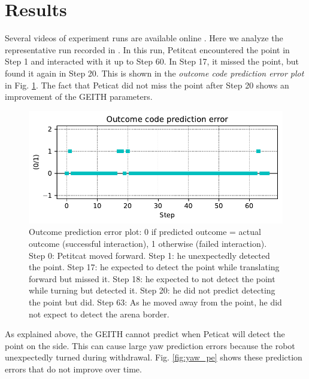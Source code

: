 \documentclass[runningheads]{llncs}
\begin{document}
\section{Results}
\label{sec:results}

Several videos of experiment runs are available online \cite{georgeon_petitcat_playlist}. 
Here we analyze the representative run recorded in \cite{georgeon_petitcat_2024}.
In this run, Petitcat encountered the point in Step 1 and interacted with it up to Step 60.
In Step 17, it missed the point, but found it again in Step 20.
This is shown in the \textit{outcome code prediction error plot} in Fig. \ref{fig:outcome}. 
The fact that Peticat did not miss the point after Step 20 shows an improvement of the GEITH parameters.

\begin{figure}
	\includegraphics[width=\textwidth]{01_Outcome_code.pdf}
	\caption{Outcome prediction error plot: 0 if predicted outcome = actual outcome (successful interaction), 1 otherwise (failed interaction).
	Step 0: Petitcat moved forward.
	Step 1: he unexpectedly detected the point.
	Step 17: he expected to detect the point while translating forward but missed it.
	Step 18: he expected to not detect the point while turning but detected it.
	Step 20: he did not predict detecting the point but did. 
	Step 63: As he moved away from the point, he did not expect to detect the arena border. } \label{fig:outcome}
\end{figure}

As explained above, the GEITH cannot predict when Peticat will detect the point on the side. 
This can cause large yaw prediction errors because the robot unexpectedly turned during withdrawal.
Fig. \ref{fig:yaw_pe} shows these prediction errors that do not improve over time. 
\end{document}
